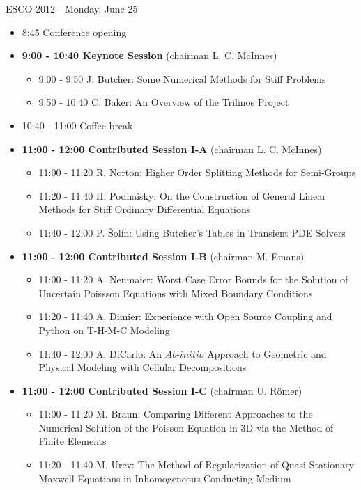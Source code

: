 \documentclass[10pt, A4]{article}%
\begin{document}
\centerline{\huge ESCO 2012 - Monday, June 25}
\vspace{4mm}

\begin{itemize}    
  \item 8:45 Conference opening
  \item {\bf 9:00 - 10:40 Keynote Session} (chairman L. C. McInnes) 
  \begin{itemize}
    \item 9:00 - 9:50 J. Butcher: Some Numerical Methods for Stiff Problems
    \item 9:50 - 10:40 C. Baker: An Overview of the Trilinos Project
  \end{itemize}
  \item 10:40 - 11:00 Coffee break
  \item {\bf 11:00 - 12:00 Contributed Session I-A} (chairman L. C. McInnes) 
  \begin{itemize}
    \item 11:00 - 11:20 R. Norton: Higher Order Splitting Methods for Semi-Groups
    \item 11:20 - 11:40 H. Podhaisky: On the Construction of General Linear Methods for Stiff Ordinary Differential Equations
    \item 11:40 - 12:00 P. \v{S}ol\'{i}n: Using Butcher's Tables in Transient PDE Solvers
  \end{itemize}
  \item {\bf 11:00 - 12:00 Contributed Session I-B} (chairman M. Emans) 
  \begin{itemize}
    \item 11:00 - 11:20 A. Neumaier: Worst Case Error Bounds for the Solution of Uncertain Poissson Equations with Mixed Boundary Conditions
    \item 11:20 - 11:40 A. Dimier: Experience with Open Source Coupling and Python on T-H-M-C Modeling
    \item 11:40 - 12:00 A. DiCarlo: An $Ab$-$initio$ Approach to Geometric and Physical Modeling with Cellular Decompositions 
  \end{itemize}
  \item {\bf 11:00 - 12:00 Contributed Session I-C} (chairman U. R\"{o}mer) 
  \begin{itemize}
	\item 11:00 - 11:20 M. Braun: Comparing Different Approaches to the Numerical Solution of the Poisson Equation in 3D via the Method of Finite Elements
    \item 11:20 - 11:40 M. Urev: The Method of Regularization of Quasi-Stationary Maxwell Equations in Inhomogeneous Conducting Medium

\end{itemize}
\end{itemize}
\end{document}
